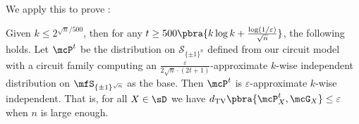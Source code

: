 We apply this to prove :
\begin{theorem}
\label{thm:2D to 1D reduction technical}
    Given $k \leq 2^{\sqrt{n}/500}$, then for any $t \geq 500\pbra{k \log k + \frac{\log(1/\varepsilon)}{\sqrt{n}}}$, the following holds. Let $\mcP^t$ be the distribution on $\mathcal{S}_{\{\pm1\}^{n}}$ defined from our circuit model with a circuit family computing an $\frac{\varepsilon}{2\sqrt{n} \cdot (2t+1)}$-approximate $k$-wise independent distribution on $\mfS_{\{\pm1\}^{\sqrt{n}}}$ as the base. Then $\mcP^t$ is $\varepsilon$-approximate $k$-wise independent. That is, for all $X \in \sD$ we have $d_{\textrm{TV}}\pbra{\mcP^t_X, \mcG_X} \leq \varepsilon$ when $n$ is large enough.
\end{theorem}


